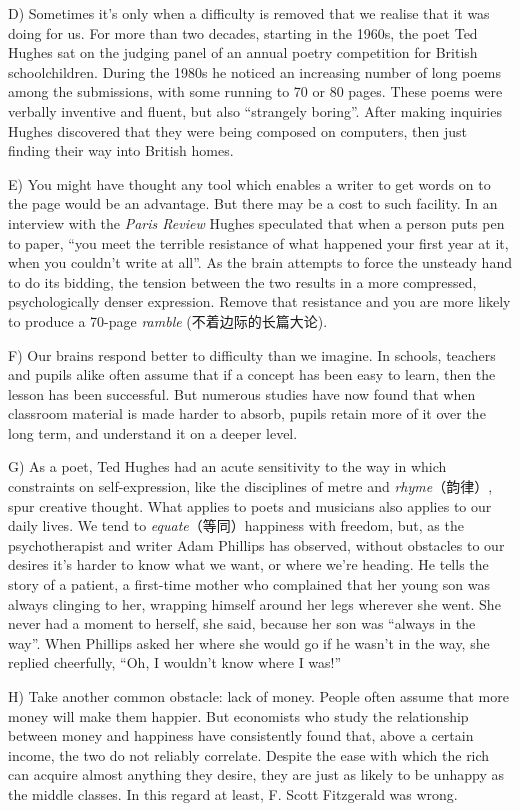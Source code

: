\documentclass[UTF8,11pt]{ctexart}
\begin{document}
D) Sometimes it’s only when a difficulty is removed that we realise that it was doing for us. For more than two decades, starting in the 1960s, the poet Ted Hughes sat on the judging panel of an annual poetry competition for British schoolchildren. During the 1980s he noticed an increasing number of long poems among the submissions, with some running to 70 or 80 pages. These poems were verbally inventive and fluent, but also “strangely boring”. After making inquiries Hughes discovered that they were being composed on computers, then just finding their way into British homes.


E) You might have thought any tool which enables a writer to get words on to the page would be an advantage. But there may be a cost to such facility. In an interview with the\textit{ Paris Review} Hughes speculated that when a person puts pen to paper, “you meet the terrible resistance of what happened your first year at it, when you couldn’t write at all”. As the brain attempts to force the unsteady hand to do its bidding, the tension between the two results in a more compressed, psychologically denser expression. Remove that resistance and you are more likely to produce a 70-page\textit{ ramble} (不着边际的长篇大论).


F) Our brains respond better to difficulty than we imagine. In schools, teachers and pupils alike often assume that if a concept has been easy to learn, then the lesson has been successful. But numerous studies have now found that when classroom material is made harder to absorb, pupils retain more of it over the long term, and understand it on a deeper level.


G) As a poet, Ted Hughes had an acute sensitivity to the way in which constraints on self-expression, like the disciplines of metre and\textit{ rhyme}（韵律）, spur creative thought. What applies to poets and musicians also applies to our daily lives. We tend to\textit{ equate}（等同）happiness with freedom, but, as the psychotherapist and writer Adam Phillips has observed, without obstacles to our desires it’s harder to know what we want, or where we’re heading. He tells the story of a patient, a first-time mother who complained that her young son was always clinging to her, wrapping himself around her legs wherever she went. She never had a moment to herself, she said, because her son was “always in the way”. When Phillips asked her where she would go if he wasn’t in the way, she replied cheerfully, “Oh, I wouldn’t know where I was!”


H) Take another common obstacle: lack of money. People often assume that more money will make them happier. But economists who study the relationship between money and happiness have consistently found that, above a certain income, the two do not reliably correlate. Despite the ease with which the rich can acquire almost anything they desire, they are just as likely to be unhappy as the middle classes. In this regard at least, F. Scott Fitzgerald was wrong.
\end{document}
